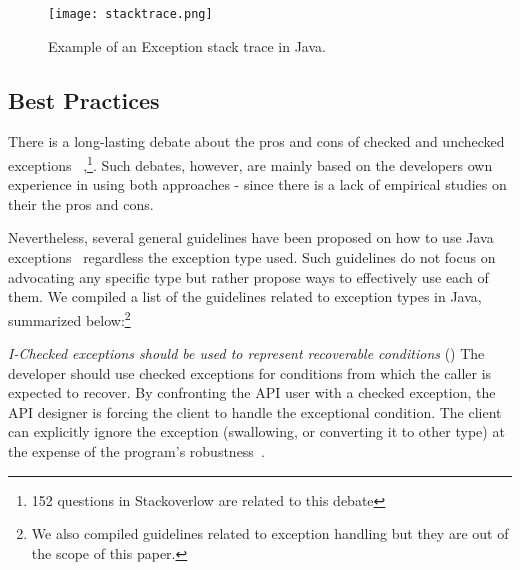 \documentclass[conference]{IEEEtran}
\begin{document}
\begin{figure} \centering \texttt{[image: stacktrace.png]}
\caption{Example of an Exception stack trace in Java.}
\label{fig:wrapping}
\end{figure}


\subsection{Best Practices}
\label{sec:best}

There is a long-lasting debate about the pros and cons of checked and unchecked exceptions 
~\cite{javatut,stackoverlow,debate},\footnote{152 questions in Stackoverlow
are related to this debate}. Such debates, however, are mainly based on the developers own experience in
using both approaches - since there is a lack of empirical studies on their the pros and cons.

Nevertheless, several general guidelines have been proposed on how to use Java
exceptions~\cite{mandrioli1992advances,gosling2000java,wirfs2006toward,
bloch2008effective} regardless the exception type used. Such guidelines do not focus on 
advocating any specific type but rather propose ways to effectively use each of them.
 We compiled a list of the guidelines related to exception types in Java, 
summarized below:\footnote{We also compiled guidelines related
to exception handling but they are out of the scope of this paper.}


\emph{I-Checked exceptions should be used to represent recoverable
conditions} (\cite{mandrioli1992advances,gosling2000java,wirfs2006toward,bloch2008effective})
The developer should use checked exceptions for conditions from which the caller
is expected to recover. By confronting the API user with a checked exception,
the API designer is forcing the client to handle the exceptional condition. The
client can explicitly ignore the exception (swallowing, or converting it to
other type) at the expense of the program's robustness~\cite{gosling2000java}.
\end{document}
